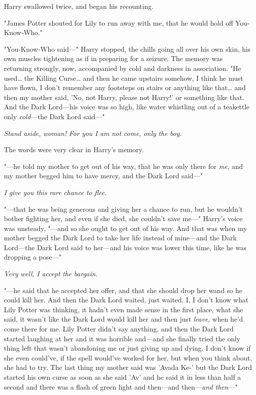 Harry swallowed twice, and began his recounting.

"James Potter shouted for Lily to run away with me, that he would hold off 
You-Know-Who."

"You-Know-Who said---" Harry stopped, the chills going all over his own skin, 
his own muscles tightening as if in preparing for a seizure. The memory was 
returning strongly, now, accompanied by cold and darkness in association. "He 
used{\ldots} the Killing Curse{\ldots} and then he came upstairs somehow, I 
think he must have flown, I don't remember any footsteps on stairs or anything 
like that{\ldots} and then my mother said, 'No, not Harry, please not Harry!' 
or something like that. And the Dark Lord---his voice was so high, like water 
whistling out of a teakettle only \emph{cold}---the Dark Lord said---"

\emph{Stand aside, woman! For you I am not come, only the boy.}

The words were very clear in Harry's memory.

"---he told my mother to get out of his way, that he was only there for 
\emph{me}, and my mother begged him to have mercy, and the Dark Lord said---"

\emph{I give you this rare chance to flee.}

"---that he was being generous and giving her a chance to run, but he wouldn't 
bother fighting her, and even if she died, she couldn't save me---" Harry's 
voice was unsteady, "---and so she ought to get out of his way. And that was 
when my mother begged the Dark Lord to take her life instead of mine---and the 
Dark Lord---the Dark Lord said to her---and his voice was lower this time, like 
he was dropping a pose---"

\emph{Very well, I accept the bargain.}

"---he said that he accepted her offer, and that she should drop her wand so he 
could kill her. And then the Dark Lord waited, just waited. I, I don't know 
what Lily Potter was thinking, it hadn't even made sense in the first place, 
what she said, it wasn't like the Dark Lord would kill her and then just 
\emph{leave,} when he'd come there for me. Lily Potter didn't say anything, and 
then the Dark Lord started laughing at her and it was horrible and---and she 
finally tried the only thing left that wasn't abandoning me or just giving up 
and dying. I don't know if she even could've, if the spell would've worked for 
her, but when you think about, she had to try. The last thing my mother said 
was 'Avada Ke-' but the Dark Lord started his own curse as soon as she said 
'Av' and he said it in less than half a second and there was a flash of green 
light and then---and then---\emph{and then}---"

